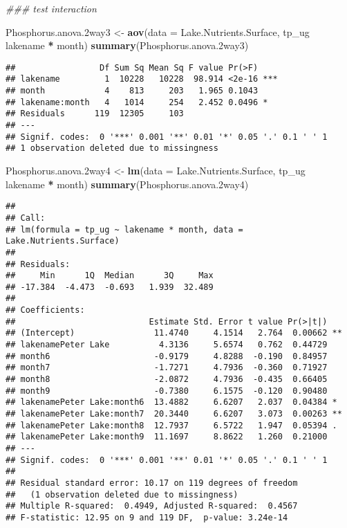 \documentclass[]{article}
\newenvironment{Shaded}{\begin{snugshade}}{\end{snugshade}}
\newcommand{\CommentTok}[1]{\textcolor[rgb]{0.56,0.35,0.01}{\textit{#1}}}
\newcommand{\DataTypeTok}[1]{\textcolor[rgb]{0.13,0.29,0.53}{#1}}
\newcommand{\FloatTok}[1]{\textcolor[rgb]{0.00,0.00,0.81}{#1}}
\newcommand{\KeywordTok}[1]{\textcolor[rgb]{0.13,0.29,0.53}{\textbf{#1}}}
\newcommand{\NormalTok}[1]{#1}
\newcommand{\OperatorTok}[1]{\textcolor[rgb]{0.81,0.36,0.00}{\textbf{#1}}}
\newcommand{\StringTok}[1]{\textcolor[rgb]{0.31,0.60,0.02}{#1}}
\begin{document}
\begin{Shaded}
\begin{Highlighting}[]
\CommentTok{### test interaction }

\NormalTok{Phosphorus.anova}\FloatTok{.2}\NormalTok{way3 <-}\StringTok{ }\KeywordTok{aov}\NormalTok{(}\DataTypeTok{data =}\NormalTok{ Lake.Nutrients.Surface, tp_ug }\OperatorTok{~}\StringTok{ }\NormalTok{lakename }\OperatorTok{*}\StringTok{ }\NormalTok{month)}
\KeywordTok{summary}\NormalTok{(Phosphorus.anova}\FloatTok{.2}\NormalTok{way3)}
\end{Highlighting}
\end{Shaded}

\begin{verbatim}
##                 Df Sum Sq Mean Sq F value Pr(>F)    
## lakename         1  10228   10228  98.914 <2e-16 ***
## month            4    813     203   1.965 0.1043    
## lakename:month   4   1014     254   2.452 0.0496 *  
## Residuals      119  12305     103                   
## ---
## Signif. codes:  0 '***' 0.001 '**' 0.01 '*' 0.05 '.' 0.1 ' ' 1
## 1 observation deleted due to missingness
\end{verbatim}

\begin{Shaded}
\begin{Highlighting}[]
\NormalTok{Phosphorus.anova}\FloatTok{.2}\NormalTok{way4 <-}\StringTok{ }\KeywordTok{lm}\NormalTok{(}\DataTypeTok{data =}\NormalTok{ Lake.Nutrients.Surface, tp_ug }\OperatorTok{~}\StringTok{ }\NormalTok{lakename }\OperatorTok{*}\StringTok{ }\NormalTok{month)}
\KeywordTok{summary}\NormalTok{(Phosphorus.anova}\FloatTok{.2}\NormalTok{way4)}
\end{Highlighting}
\end{Shaded}

\begin{verbatim}
## 
## Call:
## lm(formula = tp_ug ~ lakename * month, data = Lake.Nutrients.Surface)
## 
## Residuals:
##     Min      1Q  Median      3Q     Max 
## -17.384  -4.473  -0.693   1.939  32.489 
## 
## Coefficients:
##                           Estimate Std. Error t value Pr(>|t|)   
## (Intercept)                11.4740     4.1514   2.764  0.00662 **
## lakenamePeter Lake          4.3136     5.6574   0.762  0.44729   
## month6                     -0.9179     4.8288  -0.190  0.84957   
## month7                     -1.7271     4.7936  -0.360  0.71927   
## month8                     -2.0872     4.7936  -0.435  0.66405   
## month9                     -0.7380     6.1575  -0.120  0.90480   
## lakenamePeter Lake:month6  13.4882     6.6207   2.037  0.04384 * 
## lakenamePeter Lake:month7  20.3440     6.6207   3.073  0.00263 **
## lakenamePeter Lake:month8  12.7937     6.5722   1.947  0.05394 . 
## lakenamePeter Lake:month9  11.1697     8.8622   1.260  0.21000   
## ---
## Signif. codes:  0 '***' 0.001 '**' 0.01 '*' 0.05 '.' 0.1 ' ' 1
## 
## Residual standard error: 10.17 on 119 degrees of freedom
##   (1 observation deleted due to missingness)
## Multiple R-squared:  0.4949, Adjusted R-squared:  0.4567 
## F-statistic: 12.95 on 9 and 119 DF,  p-value: 3.24e-14
\end{verbatim}
\end{document}
